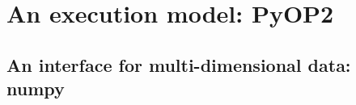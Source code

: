 \documentclass[thesis]{subfiles}
\begin{document}


\section{An execution model: PyOP2}



%
%


\subsection{An interface for multi-dimensional data: numpy}

\end{document}
